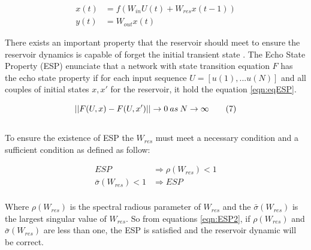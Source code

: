 \begin{equation}
\label{eqn:RCform1}
\tag{6}
\begin{split}
x(t)&=f(W_{in}U(t)+W_{res}x(t-1)) \\
y(t)&=W_{out}x(t)
\end{split}
\end{equation}

There exists an important property that the reservoir should meet to ensure the reservoir dynamics is capable of forget the initial transient state \cite{ESP_RC}. The Echo State Property (ESP) enunciate that a network with state transition equation \(F\) has the echo state property if for each input sequence \(U=[u(1),...u(N)]\) and all couples of initial states \(x, x'\) for the reservoir, it hold the equation \ref{eqn:eqESP}.

\begin{equation}
\label{eqn:eqESP}
||F(U,x)-F(U,x')|| \to 0 \: as \: N \to \infty  \tag{7}\\
\end{equation}
\\

To ensure the existence of ESP the \(W_{res}\) must meet a necessary condition and a sufficient condition as defined as follow:

\begin{equation}
\label{eqn:ESP2}
\tag{8}
\begin{split}
ESP& \Rightarrow \rho(W_{res}) < 1\\
\bar \sigma(W_{res})<1 & \Rightarrow ESP 
\end{split}
\end{equation}
\\

Where \(\rho(W_{res})\) is the spectral radious parameter of \(W_{res}\) and the \(\bar \sigma(W_{res})\) is the largest singular value of  \(W_{res}\). So from equations \ref{eqn:ESP2}, if \(\rho(W_{res})\) and \(\bar \sigma(W_{res})\) are less than one, the ESP is satisfied and the reservoir dynamic will be correct.  






